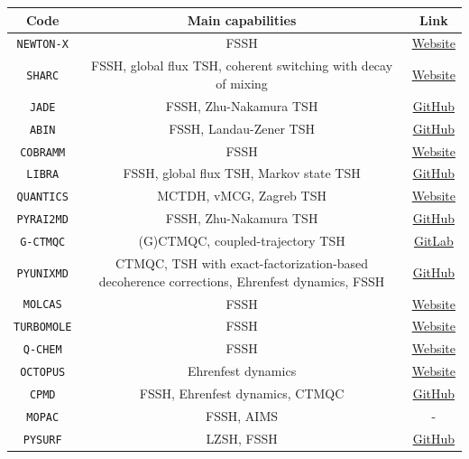 \documentclass[9pt,bestpractices]{livecoms}
\begin{document}
\begin{table}[h!]
    \centering
    \begin{tabular}{|c|c|c|}
    \hline 
    \textbf{Code}  & \textbf{Main capabilities} & \textbf{Link} \\ 
    \hline
      \texttt{NEWTON-X} & FSSH  & \href{https://newtonx.org}{Website} \\
      \texttt{SHARC}   & FSSH, global flux TSH, coherent switching with decay of mixing & \href{https://sharc-md.org}{Website}\\
      \texttt{JADE}   & FSSH, Zhu-Nakamura TSH & \href{https://github.com/zglan/JADE-NAMD}{GitHub}\\
      \texttt{ABIN}   & FSSH, Landau-Zener TSH & \href{https://github.com/PHOTOX/ABIN}{GitHub} \\
      \texttt{COBRAMM} & FSSH  & \href{https://site.unibo.it/cobramm/en}{Website} \\
      \texttt{LIBRA} & FSSH,  global flux TSH, Markov state TSH  & \href{https://github.com/Quantum-Dynamics-Hub/Libra-X}{GitHub} \\
      \texttt{QUANTICS} & MCTDH, vMCG, Zagreb TSH & \href{https://www.chem.ucl.ac.uk/quantics/}{Website} \\
    \texttt{PYRAI2MD} & FSSH, Zhu-Nakamura TSH  & \href{https://github.com/mlcclab/PyRAI2MD-hiam}{GitHub} \\   
          \texttt{G-CTMQC} & (G)CTMQC, coupled-trajectory TSH & \href{https://gitlab.com/agostini.work/g-ctmqc}{GitLab} \\
        \texttt{PYUNIXMD} & CTMQC, TSH with exact-factorization-based decoherence corrections, Ehrenfest dynamics, FSSH & \href{https://github.com/skmin-lab/unixmd}{GitHub} \\
       \texttt{MOLCAS} & FSSH & \href{https://www.molcas.org}{Website} \\
        \texttt{TURBOMOLE} & FSSH & \href{https://www.turbomole.org}{Website} \\
        \texttt{Q-CHEM} & FSSH & \href{http://www.q-chem.com}{Website} \\
        \texttt{OCTOPUS} & Ehrenfest dynamics  & \href{https://octopus-code.org/documentation/16/}{Website} \\
        \texttt{CPMD} & FSSH, Ehrenfest dynamics, CTMQC  & \href{https://github.com/CPMD-code}{GitHub} \\
                \texttt{MOPAC}  & FSSH, AIMS & -  \\
        \texttt{PYSURF} & LZSH, FSSH & \href{https://github.com/MFSJMenger/pysurf}{GitHub} \\

\end{tabular}
\end{table}
\end{document}
